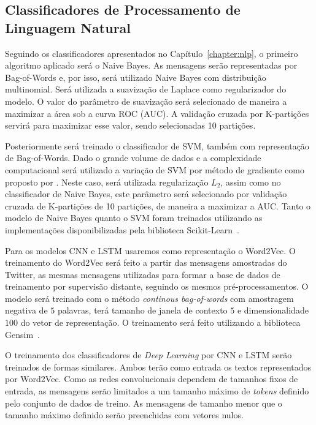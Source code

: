 \subsection{Classificadores de Processamento de Linguagem Natural}
\label{sec:nlp-classifier}

Seguindo os classificadores apresentados no Capítulo~\ref{chapter:nlp}, o
primeiro algoritmo aplicado será o Naive Bayes.
As mensagens serão representadas por Bag-of-Words e, por isso, será utilizado
Naive Bayes com distribuição multinomial.
Será utilizada a suavização de Laplace como regularizador do modelo.
O valor do parâmetro de suavização será selecionado de maneira a maximizar a
área sob a curva ROC (AUC).
A validação cruzada por K-partições servirá para maximizar esse valor, sendo
selecionadas 10 partições.

Posteriormente será treinado o classificador de SVM, também com representação de
Bag-of-Words.
Dado o grande volume de dados e a complexidade computacional será utilizado a
variação de SVM por método de gradiente como proposto por \citet{suykens99}.
Neste caso, será utilizada regularização $L_2$, assim como no classificador de
Naive Bayes, este parâmetro será selecionado por validação cruzada de
K-partições de 10 partições, de maneira a maximizar a AUC.
Tanto o modelo de Naive Bayes quanto o SVM foram treinados utilizando as
implementações disponibilizadas pela biblioteca Scikit-Learn~\cite{sklearn11}.

Para os modelos CNN e LSTM usaremos como representação o Word2Vec.
O treinamento do Word2Vec será feito a partir das mensagens amostradas do
Twitter, as mesmas mensagens utilizadas para formar a base de dados de treinamento
por supervisão distante, seguindo os mesmos pré-processamentos.
O modelo será treinado com o método \textit{continous bag-of-words} com
amostragem negativa de $5$ palavras, terá tamanho de janela de contexto $5$ e
dimensionalidade $100$ do vetor de representação.
O treinamento será feito utilizando a biblioteca Gensim~\cite{rehurek10}.

O treinamento dos classificadores de \textit{Deep Learning} por CNN e LSTM serão
treinados de formas similares.
Ambos terão como entrada os textos representados por Word2Vec.
Como as redes convolucionais dependem de tamanhos fixos de entrada, as mensagens
serão limitados a um tamanho máximo de \textit{tokens} definido pelo conjunto de
dados de treino.
As mensagens de tamanho menor que o tamanho máximo definido serão preenchidas
com vetores nulos.

